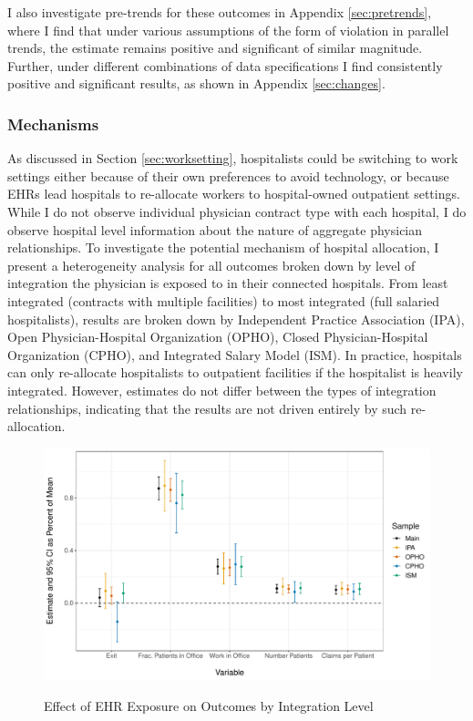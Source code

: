 \documentclass[12pt]{article}
\begin{document}
I also investigate pre-trends for these outcomes in Appendix \ref{sec:pretrends}, where I find that under various assumptions of the form of violation in parallel trends, the estimate remains positive and significant of similar magnitude. Further, under different combinations of data specifications I find consistently positive and significant results, as shown in Appendix \ref{sec:changes}. 

\subsubsection{Mechanisms}

As discussed in Section \ref{sec:worksetting}, hospitalists could be switching to work settings either because of their own preferences to avoid technology, or because EHRs lead hospitals to re-allocate workers to hospital-owned outpatient settings. While I do not observe individual physician contract type with each hospital, I do observe hospital level information about the nature of aggregate physician relationships. To investigate the potential mechanism of hospital allocation, I present a heterogeneity analysis for all outcomes broken down by level of integration the physician is exposed to in their connected hospitals. From least integrated (contracts with multiple facilities) to most integrated (full salaried hospitalists), results are broken down by Independent Practice Association (IPA), Open Physician-Hospital Organization (OPHO), Closed Physician-Hospital Organization (CPHO), and Integrated Salary Model (ISM). In practice, hospitals can only re-allocate hospitalists to outpatient facilities if the hospitalist is heavily integrated. However, estimates do not differ between the types of integration relationships, indicating that the results are not driven entirely by such re-allocation. 

\begin{figure}
    \centering
    \caption{Effect of EHR Exposure on Outcomes by Integration Level}
    \includegraphics[width=\textwidth]{Objects/heterog_plot_int.pdf}
    \label{fig:het_int}
\end{figure}
\end{document}
